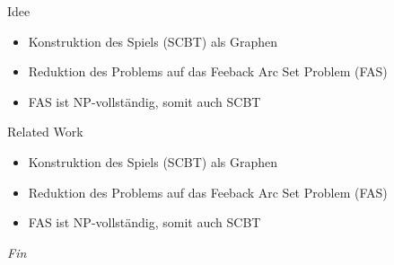\documentclass{beamer}
\begin{document}
\begin{frame}{Idee}
	\begin{itemize}
		\item Konstruktion des Spiels (SCBT) als Graphen 
		\item Reduktion des Problems auf das Feeback Arc Set Problem (FAS)
		\item FAS ist NP-vollständig, somit auch SCBT
	\end{itemize}
\end{frame}

\begin{frame}{Related Work}
	\begin{itemize}
		\item Konstruktion des Spiels (SCBT) als Graphen 
		\item Reduktion des Problems auf das Feeback Arc Set Problem (FAS)
		\item FAS ist NP-vollständig, somit auch SCBT
	\end{itemize}
\end{frame}



\begin{frame}{}
  \centering \Huge
  \emph{Fin}
\end{frame}


	
    	
    	
    	
\end{document}
